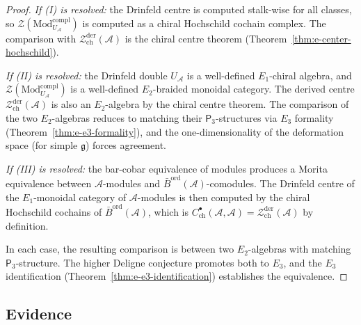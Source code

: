 \documentclass[11pt,reqno]{amsart}
\theoremstyle{definition}
\theoremstyle{remark}
\providecommand{\cA}{\mathcal{A}}
\providecommand{\cZ}{\mathcal{Z}}
\providecommand{\fg}{\mathfrak{g}}
\providecommand{\Eone}{E_1}
\providecommand{\Etwo}{E_2}
\providecommand{\Ethree}{E_3}
\providecommand{\Pthree}{\mathsf{P}_3}
\providecommand{\Barord}{\bar{B}^{\mathrm{ord}}}
\begin{document}
\begin{proof}
\emph{If (I) is resolved:} the Drinfeld centre is computed
stalk-wise for all classes, so
\(\mathcal Z(\mathrm{Mod}^{\mathrm{compl}}_{U_\cA})\) is computed as
a chiral Hochschild cochain complex. The comparison with
$\cZ^{\mathrm{der}}_{\mathrm{ch}}(\cA)$ is the chiral
centre theorem (Theorem~\ref{thm:e-center-hochschild}).

\emph{If (II) is resolved:} the Drinfeld double $U_\cA$ is
a well-defined $\Eone$-chiral algebra, and
\(\mathcal Z(\mathrm{Mod}^{\mathrm{compl}}_{U_\cA})\) is a
well-defined $\Etwo$-braided monoidal category. The derived centre
$\cZ^{\mathrm{der}}_{\mathrm{ch}}(\cA)$ is also an
$\Etwo$-algebra by the chiral centre theorem. The comparison
of the two $\Etwo$-algebras reduces to matching their
$\Pthree$-structures via $\Ethree$ formality
(Theorem~\ref{thm:e-e3-formality}), and the one-dimensionality
of the deformation space (for simple $\fg$) forces agreement.

\emph{If (III) is resolved:} the bar-cobar equivalence of
modules produces a Morita equivalence between $\cA$-modules
and $\Barord(\cA)$-comodules. The Drinfeld centre of the
$\Eone$-monoidal category of $\cA$-modules is then computed
by the chiral Hochschild cochains of $\Barord(\cA)$, which is
$C^\bullet_{\mathrm{ch}}(\cA, \cA) =
\cZ^{\mathrm{der}}_{\mathrm{ch}}(\cA)$ by definition.

In each case, the resulting comparison is between two
$\Etwo$-algebras with matching $\Pthree$-structure. The
higher Deligne conjecture promotes both to $\Ethree$, and
the $\Ethree$ identification
(Theorem~\ref{thm:e-e3-identification}) establishes the
equivalence.
\end{proof}

\subsection{Evidence}
\end{document}
